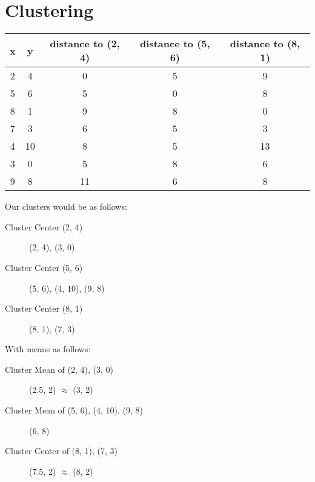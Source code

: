 \documentclass[12pt]{scrartcl}
\begin{document}
\section{Clustering}

\begin{table}[H]
    \centering
    \begin{tabular}{|c|c|c|c|c|}
        \hline
        x & y  & distance to (2, 4) & distance to (5, 6) & distance to (8, 1) \\\hline
        2 & 4  & 0                  & 5                  & 9 \\
        5 & 6  & 5                  & 0                  & 8 \\
        8 & 1  & 9                  & 8                  & 0 \\
        7 & 3  & 6                  & 5                  & 3 \\
        4 & 10 & 8                  & 5                  & 13 \\
        3 & 0  & 5                  & 8                  & 6 \\
        9 & 8  & 11                 & 6                  & 8 \\
        \hline
    \end{tabular}
\end{table}

Our clusters would be as follows:

\begin{description}
    \item[Cluster Center (2, 4)] (2, 4), (3, 0)
    \item[Cluster Center (5, 6)] (5, 6), (4, 10), (9, 8)
    \item[Cluster Center (8, 1)] (8, 1), (7, 3)
\end{description}

With means as follows:

\begin{description}
    \item[Cluster Mean of (2, 4), (3, 0)] (2.5, 2) $\approx$ (3, 2)
    \item[Cluster Mean of (5, 6), (4, 10), (9, 8)] (6, 8)
    \item[Cluster Center of (8, 1), (7, 3)] (7.5, 2) $\approx$ (8, 2)
\end{description}
\end{document}
